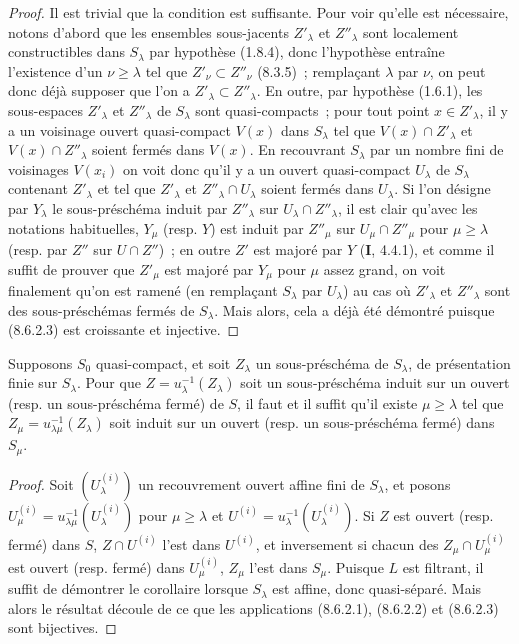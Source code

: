 \begin{proof}
Il est trivial que la condition est suffisante. Pour voir qu'elle est
nécessaire, notons d'abord que les ensembles sous-jacents $Z'_\lambda$ et
$Z''_\lambda$ sont localement constructibles dans $S_\lambda$ par hypothèse
(1.8.4), donc l'hypothèse entraîne l'existence d'un $\nu\geq\lambda$ tel
que $Z'_\nu\subset Z''_\nu$ (8.3.5)~; remplaçant $\lambda$ par $\nu$, on peut
donc déjà supposer que l'on a $Z'_\lambda\subset Z''_\lambda$. En outre, par
hypothèse (1.6.1), les sous-espaces $Z'_\lambda$ et $Z''_\lambda$ de
$S_\lambda$ sont quasi-compacts~; pour tout point $x\in Z'_\lambda$, il y a un
voisinage ouvert quasi-compact $V(x)$ dans $S_\lambda$ tel que
$V(x)\cap Z'_\lambda$ et $V(x)\cap Z''_\lambda$ soient fermés dans $V(x)$. En
recouvrant $S_\lambda$ par un nombre fini de voisinages $V(x_i)$ on voit donc
qu'il y a un ouvert quasi-compact $U_\lambda$ de $S_\lambda$ contenant
$Z'_\lambda$ et tel que $Z'_\lambda$ et $Z''_\lambda\cap U_\lambda$ soient
fermés dans $U_\lambda$. Si l'on désigne par $Y_\lambda$ le sous-préschéma
induit par $Z''_\lambda$ sur $U_\lambda\cap Z''_\lambda$, il est clair qu'avec
les notations habituelles, $Y_\mu$ (resp. $Y$) est induit par $Z''_\mu$ sur
$U_\mu\cap Z''_\mu$ pour $\mu\geq\lambda$ (resp. par $Z''$ sur
$U\cap Z''$)~; en outre $Z'$ est majoré par $Y$ (\textbf{I}, 4.4.1), et comme il suffit
de prouver que $Z'_\mu$ est majoré par $Y_\mu$ pour $\mu$
assez grand, on voit finalement qu'on est ramené (en remplaçant $S_\lambda$
par $U_\lambda$) au cas où $Z'_\lambda$ et $Z''_\lambda$ sont des
sous-préschémas fermés de $S_\lambda$. Mais alors, cela a déjà été démontré
puisque (8.6.2.3) est croissante et injective.
\end{proof}

\begin{corollary}[8.6.4]
\label{IV.8.6.4-fr}
Supposons $S_0$ quasi-compact, et soit $Z_\lambda$ un sous-préschéma de
$S_\lambda$, de présentation finie sur $S_\lambda$. Pour que
$Z=u_\lambda^{-1}(Z_\lambda)$ soit un sous-préschéma induit sur un ouvert
\textup{(resp.} un sous-préschéma fermé\textup{)} de $S$, il faut et il suffit qu'il existe
$\mu\geq\lambda$ tel que $Z_\mu=u_{\lambda\mu}^{-1}(Z_\lambda)$ soit induit
sur un ouvert \textup{(resp.} un sous-préschéma fermé\textup{)} dans $S_\mu$.
\end{corollary}

\begin{proof}
Soit $(U_\lambda^{(i)})$ un recouvrement ouvert affine fini de $S_\lambda$, et
posons $U_\mu^{(i)}=u_{\lambda\mu}^{-1}(U_\lambda^{(i)})$ pour
$\mu\geq\lambda$ et $U^{(i)}=u_\lambda^{-1}(U_\lambda^{(i)})$. Si $Z$ est
ouvert (resp. fermé) dans $S$, $Z\cap U^{(i)}$ l'est dans $U^{(i)}$, et
inversement si chacun des $Z_\mu\cap U_\mu^{(i)}$ est ouvert (resp. fermé)
dans $U_\mu^{(i)}$, $Z_\mu$ l'est dans $S_\mu$. Puisque $L$ est filtrant, il
suffit de démontrer le corollaire lorsque $S_\lambda$ est affine, donc
quasi-séparé. Mais alors le résultat découle de ce que les applications
(8.6.2.1), (8.6.2.2) et (8.6.2.3) sont bijectives.
\end{proof}

